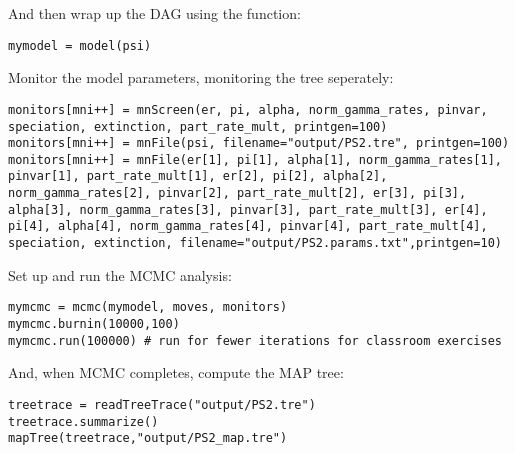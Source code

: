And then wrap up the DAG using the  function:
{\tt \begin{snugshade*}
\begin{lstlisting}
mymodel = model(psi)
\end{lstlisting}
\end{snugshade*}}

Monitor the model parameters, monitoring the tree seperately:

{\tt \begin{snugshade*}
\begin{lstlisting}
monitors[mni++] = mnScreen(er, pi, alpha, norm_gamma_rates, pinvar, speciation, extinction, part_rate_mult, printgen=100)
monitors[mni++] = mnFile(psi, filename="output/PS2.tre", printgen=100)
monitors[mni++] = mnFile(er[1], pi[1], alpha[1], norm_gamma_rates[1], pinvar[1], part_rate_mult[1], er[2], pi[2], alpha[2], norm_gamma_rates[2], pinvar[2], part_rate_mult[2], er[3], pi[3], alpha[3], norm_gamma_rates[3], pinvar[3], part_rate_mult[3], er[4], pi[4], alpha[4], norm_gamma_rates[4], pinvar[4], part_rate_mult[4], speciation, extinction, filename="output/PS2.params.txt",printgen=10)
\end{lstlisting}
\end{snugshade*}}

Set up and run the MCMC analysis:

{\tt \begin{snugshade*}
\begin{lstlisting}
mymcmc = mcmc(mymodel, moves, monitors)
mymcmc.burnin(10000,100)
mymcmc.run(100000) # run for fewer iterations for classroom exercises
\end{lstlisting}
\end{snugshade*}}

And, when MCMC completes, compute the MAP tree:

{\tt \begin{snugshade*}
\begin{lstlisting}
treetrace = readTreeTrace("output/PS2.tre")
treetrace.summarize()
mapTree(treetrace,"output/PS2_map.tre")
\end{lstlisting}
\end{snugshade*}}


